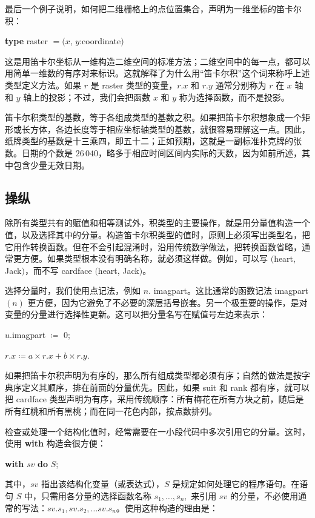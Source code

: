 \documentclass[twoside,11pt,fontset=none]{ctexbook}
\begin{document}
最后一个例子说明，如何把二维栅格上的点位置集合，声明为一维坐标的笛卡尔积：

\quad \textbf{type} raster $= (x$, $y$:coordinate$)$

这是用笛卡尔坐标从一维构造二维空间的标准方法；二维空间中的每一点，都可以用简单一维数的有序对来标识。这就解释了为什么用“笛卡尔积”这个词来称呼上述类型定义方法。如果 $r$ 是 raster 类型的变量，$r.x$ 和 $r.y$ 通常分别称为 $r$ 在 $x$ 轴和 $y$ 轴上的投影；不过，我们会把函数 $x$ 和 $y$ 称为选择函数，而不是投影。

笛卡尔积类型的基数，等于各组成类型的基数之积。如果把笛卡尔积想象成一个矩形或长方体，各边长度等于相应坐标轴类型的基数，就很容易理解这一点。因此，纸牌类型的基数是十三乘四，即五十二；正如预期，这就是一副标准扑克牌的张数。日期的个数是 $26\,040$，略多于相应时间区间内实际的天数，因为如前所述，其中包含少量无效日期。

\subsection{操纵}

除所有类型共有的赋值和相等测试外，积类型的主要操作，就是用分量值构造一个值，以及选择其中的分量。构造笛卡尔积类型的值时，原则上必须写出类型名，把它用作转换函数。但在不会引起混淆时，沿用传统数学做法，把转换函数省略，通常更方便。如果类型根本没有明确名称，就必须这样做。例如，可以写 $($heart, Jack$)$，而不写 cardface $($heart, Jack$)$。

选择分量时，我们使用点记法，例如 $n$. imagpart。这比通常的函数记法 imagpart$(n)$ 更方便，因为它避免了不必要的深层括号嵌套。另一个极重要的操作，是对变量的分量进行选择性更新。这可以把分量名写在赋值号左边来表示：

\quad $u$.imagpart $\coloneq$ 0;

\quad $r.x \coloneq a\times r.x + b\times r.y$.

如果把笛卡尔积声明为有序的，那么所有组成类型都必须有序；自然的做法是按字典序定义其顺序，排在前面的分量优先。因此，如果 suit 和 rank 都有序，就可以把 cardface 类型声明为有序，采用传统顺序：所有梅花在所有方块之前，随后是所有红桃和所有黑桃；而在同一花色内部，按点数排列。

检查或处理一个结构化值时，经常需要在一小段代码中多次引用它的分量。这时，使用 \textbf{with} 构造会很方便：

\quad \textbf{with} $sv$ \textbf{do} $S$;

\noindent
其中，$sv$ 指出该结构化变量（或表达式），$S$ 是规定如何处理它的程序语句。在语句 $S$ 中，只需用各分量的选择函数名称 $s_1, \dots, s_n,$ 来引用 $sv$ 的分量，不必使用通常的写法：$sv.s_1, sv.s_2, \dots sv.s_n$。使用这种构造的理由是：
\end{document}
